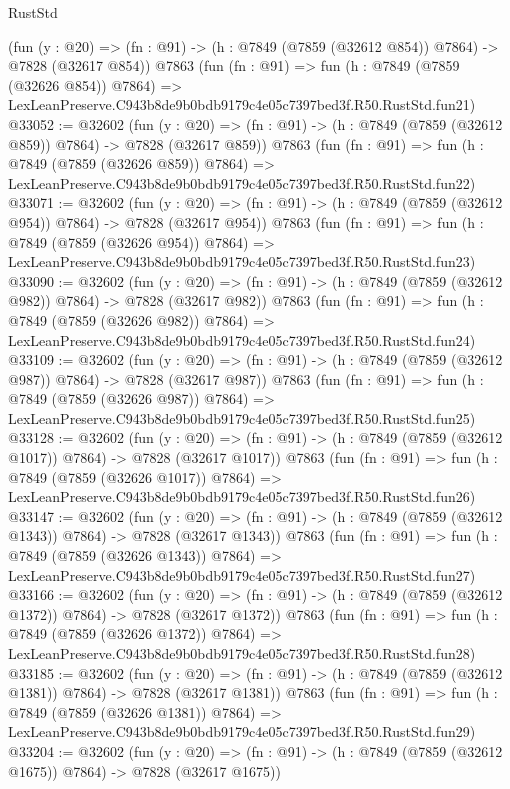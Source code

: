 \begin{lexlean}{RustStd}
\begin{coremodule}
    (fun (y : @20) => (fn : @91) -> (h : @7849 (@7859 (@32612 @854)) @7864) -> @7828 (@32617 @854))
    @7863
    (fun (fn : @91) =>
    fun (h : @7849 (@7859 (@32626 @854)) @7864) =>
    LexLeanPreserve.C943b8de9b0bdb9179c4e05c7397bed3f.R50.RustStd.fun21)
@33052 := @32602
    (fun (y : @20) => (fn : @91) -> (h : @7849 (@7859 (@32612 @859)) @7864) -> @7828 (@32617 @859))
    @7863
    (fun (fn : @91) =>
    fun (h : @7849 (@7859 (@32626 @859)) @7864) =>
    LexLeanPreserve.C943b8de9b0bdb9179c4e05c7397bed3f.R50.RustStd.fun22)
@33071 := @32602
    (fun (y : @20) => (fn : @91) -> (h : @7849 (@7859 (@32612 @954)) @7864) -> @7828 (@32617 @954))
    @7863
    (fun (fn : @91) =>
    fun (h : @7849 (@7859 (@32626 @954)) @7864) =>
    LexLeanPreserve.C943b8de9b0bdb9179c4e05c7397bed3f.R50.RustStd.fun23)
@33090 := @32602
    (fun (y : @20) => (fn : @91) -> (h : @7849 (@7859 (@32612 @982)) @7864) -> @7828 (@32617 @982))
    @7863
    (fun (fn : @91) =>
    fun (h : @7849 (@7859 (@32626 @982)) @7864) =>
    LexLeanPreserve.C943b8de9b0bdb9179c4e05c7397bed3f.R50.RustStd.fun24)
@33109 := @32602
    (fun (y : @20) => (fn : @91) -> (h : @7849 (@7859 (@32612 @987)) @7864) -> @7828 (@32617 @987))
    @7863
    (fun (fn : @91) =>
    fun (h : @7849 (@7859 (@32626 @987)) @7864) =>
    LexLeanPreserve.C943b8de9b0bdb9179c4e05c7397bed3f.R50.RustStd.fun25)
@33128 := @32602
    (fun (y : @20) =>
    (fn : @91) -> (h : @7849 (@7859 (@32612 @1017)) @7864) -> @7828 (@32617 @1017))
    @7863
    (fun (fn : @91) =>
    fun (h : @7849 (@7859 (@32626 @1017)) @7864) =>
    LexLeanPreserve.C943b8de9b0bdb9179c4e05c7397bed3f.R50.RustStd.fun26)
@33147 := @32602
    (fun (y : @20) =>
    (fn : @91) -> (h : @7849 (@7859 (@32612 @1343)) @7864) -> @7828 (@32617 @1343))
    @7863
    (fun (fn : @91) =>
    fun (h : @7849 (@7859 (@32626 @1343)) @7864) =>
    LexLeanPreserve.C943b8de9b0bdb9179c4e05c7397bed3f.R50.RustStd.fun27)
@33166 := @32602
    (fun (y : @20) =>
    (fn : @91) -> (h : @7849 (@7859 (@32612 @1372)) @7864) -> @7828 (@32617 @1372))
    @7863
    (fun (fn : @91) =>
    fun (h : @7849 (@7859 (@32626 @1372)) @7864) =>
    LexLeanPreserve.C943b8de9b0bdb9179c4e05c7397bed3f.R50.RustStd.fun28)
@33185 := @32602
    (fun (y : @20) =>
    (fn : @91) -> (h : @7849 (@7859 (@32612 @1381)) @7864) -> @7828 (@32617 @1381))
    @7863
    (fun (fn : @91) =>
    fun (h : @7849 (@7859 (@32626 @1381)) @7864) =>
    LexLeanPreserve.C943b8de9b0bdb9179c4e05c7397bed3f.R50.RustStd.fun29)
@33204 := @32602
    (fun (y : @20) =>
    (fn : @91) -> (h : @7849 (@7859 (@32612 @1675)) @7864) -> @7828 (@32617 @1675))

\end{coremodule}
\end{lexlean}
